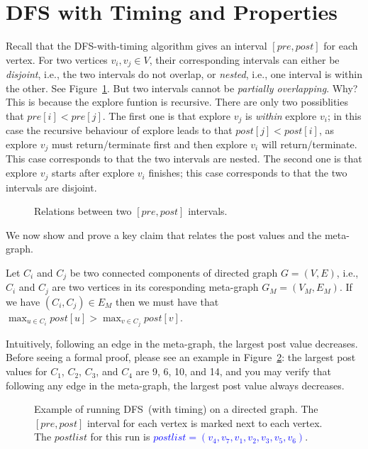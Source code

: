 \section*{DFS with Timing and Properties}

Recall that the DFS-with-timing algorithm gives an interval $[pre,post]$ for each vertex.
For two vertices $v_i,v_j\in V$, their corresponding intervals can either be
\emph{disjoint}, i.e., the two intervals do not overlap, or \emph{nested}, i.e.,
one interval is within the other. See Figure~\ref{fig:interval}.
But two intervals cannot be \emph{partially overlapping}. Why? This is because
the explore funtion is recursive. There are only two possiblities
that $pre[i] < pre[j]$. The first one is that explore $v_j$ is \emph{within} explore $v_i$;
in this case the recursive behaviour of explore leads to that $post[j] < post[i]$,
as explore $v_j$ must return/terminate first and then explore $v_i$ will return/terminate.
This case corresponds to that the two intervals are nested.
The second one is that explore $v_j$ starts after explore $v_i$ finishes;
this case corresponds to that the two intervals are disjoint.

\begin{figure}[h!]
\centering{}
\caption{Relations between two $[pre,post]$ intervals.}
\label{fig:interval}
\end{figure}

We now show and prove a key claim that relates the post values and the meta-graph.

\begin{claim}
Let $C_i$ and $C_j$ be two connected components of directed graph $G = (V, E)$, i.e., $C_i$ and $C_j$ are two
vertices in its coresponding meta-graph $G_M = (V_M, E_M)$. If we have $(C_i, C_j) \in E_M$ then
we must have that $\max_{u\in C_i} post[u] > \max_{v\in C_j} post[v]$.
\end{claim}

Intuitively, following an edge in the meta-graph, the largest post value decreases.
Before seeing a formal proof, please see an example in Figure~\ref{fig:dfs}:
the largest post values for $C_1$, $C_2$, $C_3$, and $C_4$ are 9, 6, 10, and 14,
and you may verify that following any edge in the meta-graph, the largest post value always decreases.

\begin{figure}[h!]
\centering{}
\caption{Example of running DFS~(with timing) on a directed graph. The $[pre,post]$ interval for each vertex
is marked next to each vertex.  The $postlist$ for this run is \textcolor{blue}{$postlist = (v_4,v_7,v_1,v_2,v_3,v_5,v_6)$}.  }
\label{fig:dfs}
\end{figure}



